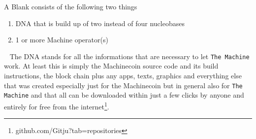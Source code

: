 \documentclass{beamer}
\begin{document}
\frame
{
A Blank consists of the following two things
\begin{enumerate}
\item DNA that is build up of two instead of four nucleobases
\item 1 or more Machine operator(s)
\end{enumerate}
\ 
\newline
The DNA stands for all the informations that are necessary to let \texttt{The Machine} work. At least this is simply the Machinecoin source code and its build instructions, the block chain plus any apps, texts, graphics and everything else that was created especially just for the Machinecoin but in general also for \texttt{The Machine} and that all can be downloaded within just a few clicks by anyone and entirely for free from the internet\footnote{github.com/Gitju?tab=repositories}. 
}
\end{document}
